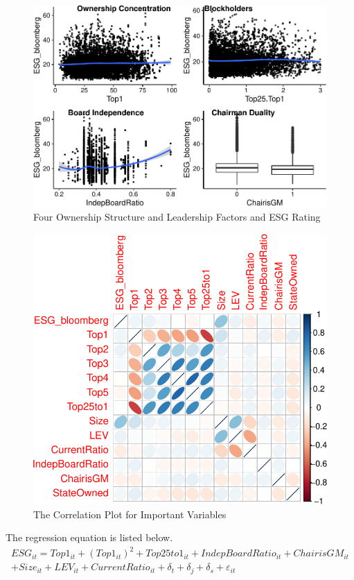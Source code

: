 \documentclass[
  12pt,
]{article}
\begin{document}
\begin{figure}
\centering
\includegraphics{FinalProject.Ruan.Muradov_files/figure-latex/plots-1.pdf}
\caption{Four Ownership Structure and Leadership Factors and ESG Rating}
\end{figure}

\begin{figure}
\centering
\includegraphics{FinalProject.Ruan.Muradov_files/figure-latex/correlation2-1.pdf}
\caption{The Correlation Plot for Important Variables}
\end{figure}

The regression equation is listed below. \begin{equation*}
\begin{split}
ESG_{it} = Top1_{it} + (Top1_{it})^2 + Top25to1_{it} + IndepBoardRatio_{it} + ChairisGM_{it} \\+ Size_{it} + LEV_{it} + CurrentRatio_{it} + \delta_t+\delta_j+\delta_{s}+\varepsilon_{it}
\end{split}
\end{equation*}
\end{document}
